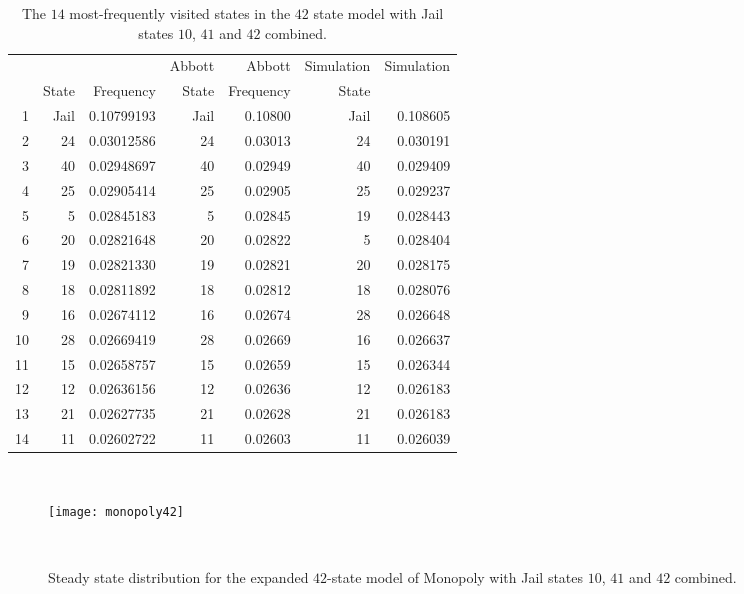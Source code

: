 \documentclass[12pt]{article}
\begin{document}
\begin{table}
    \centering
    \begin{tabular}{rrrrrrr}
           &            &            & Abbott     & Abbott    & Simulation & Simulation \\ 
           & State      & Frequency  & State      & Frequency & State      &            \\ 
        1  & Jail       & 0.10799193 & Jail       & 0.10800   & Jail       & 0.108605   \\ 
        2  & 24         & 0.03012586 & 24         & 0.03013   & 24         & 0.030191   \\ 
        3  & 40         & 0.02948697 & 40         & 0.02949   & 40         & 0.029409   \\ 
        4  & 25         & 0.02905414 & 25         & 0.02905   & 25         & 0.029237   \\ 
        5  & 5          & 0.02845183 & 5          & 0.02845   & 19         & 0.028443   \\ 
        6  & 20         & 0.02821648 & 20         & 0.02822   & 5          & 0.028404   \\ 
        7  & 19         & 0.02821330 & 19         & 0.02821   & 20         & 0.028175   \\ 
        8  & 18         & 0.02811892 & 18         & 0.02812   & 18         & 0.028076   \\ 
        9  & 16         & 0.02674112 & 16         & 0.02674   & 28         & 0.026648   \\ 
        10 & 28         & 0.02669419 & 28         & 0.02669   & 16         & 0.026637   \\ 
        11 & 15         & 0.02658757 & 15         & 0.02659   & 15         & 0.026344   \\ 
        12 & 12         & 0.02636156 & 12         & 0.02636   & 12         & 0.026183   \\ 
        13 & 21         & 0.02627735 & 21         & 0.02628   & 21         & 0.026183   \\ 
        14 & 11         & 0.02602722 & 11         & 0.02603   & 11         & 0.026039   \\ 
    \end{tabular}
    \caption{The $ 14 $ most-frequently visited states in the $ 42 $
    state model with Jail states $ 10 $, $ 41 $ and $ 42 $
    combined.}~%
    \label{tab:monopoly:freq42}
\end{table}

\begin{figure}
    \centering
    \texttt{[image: monopoly42]}
    \caption{Steady state distribution for the expanded $ 42 $-state
    model of Monopoly with Jail states $ 10 $, $ 41 $ and $ 42 $
    combined.}~%
    \label{fig:monopoly:monopoly42}
\end{figure}
\end{document}
